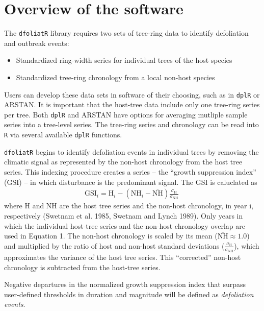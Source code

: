 \documentclass[review]{elsarticle} %
\providecommand{\tightlist}{%
  \setlength{\itemsep}{0pt}\setlength{\parskip}{0pt}}
\begin{document}
\hypertarget{overview-of-the-software}{%
\section{Overview of the software}\label{overview-of-the-software}}

The \texttt{dfoliatR} library requires two sets of tree-ring data to
identify defoliation and outbreak events:

\begin{itemize}
\tightlist
\item
  Standardized ring-width series for individual trees of the host
  species
\item
  Standardized tree-ring chronology from a local non-host species
\end{itemize}

Users can develop these data sets in software of their choosing, such as
in \texttt{dplR} or ARSTAN. It is important that the host-tree data
include only one tree-ring series per tree. Both \texttt{dplR} and
ARSTAN have options for averaging mutliple sample series into a
tree-level series. The tree-ring series and chronology can be read into
\texttt{R} via several available \texttt{dplR} functions.

\texttt{dfoliatR} begins to identify defoliation events in individual
trees by removing the climatic signal as represented by the non-host
chronology from the host tree series. This indexing procedure creates a
series -- the ``growth suppression index'' (GSI) -- in which disturbance
is the predominant signal. The GSI is caluclated as \begin{align}
\textrm{GSI}_{i} = \textrm{H}_{i} - \left( \textrm{NH}_{i} - \overline{\textrm{NH}} \right) \frac{\sigma_{\textrm{H}}}{\sigma_{\textrm{NH}}} \
\end{align} where H and NH are the host tree series and the non-host
chronology, in year i, respectively (Swetnam et al. 1985, Swetnam and
Lynch 1989). Only years in which the individual host-tree series and the
non-host chronology overlap are used in Equation 1. The non-host
chronology is scaled by its mean
(\(\overline{\textrm{NH}} \approx 1.0\)) and multiplied by the ratio of
host and non-host standard deviations
(\(\frac{\sigma_{\textrm{H}}}{\sigma_{\textrm{NH}}}\)), which
approximates the variance of the host tree series. This ``corrected''
non-host chronology is subtracted from the host-tree series.

Negative departures in the normalized growth suppression index that
surpass user-defined thresholds in duration and magnitude will be
defined as \emph{defoliation events}.
\end{document}
